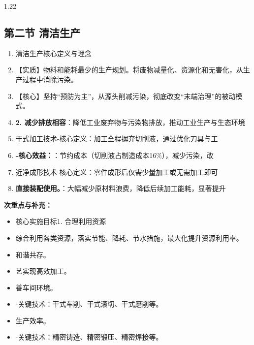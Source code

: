 \documentclass[12pt,a4paper]{article}
\begin{document}
\begin{spacing}{1.22}
\subsection{第二节 清洁生产}
\begin{tcolorbox}[colback=yellow!6,colframe=red!55!black,title=重点,left=1mm,right=1mm]
\begin{enumerate}[leftmargin=2.2em,label=\arabic*.]
  \item 清洁生产核心定义与理念
  \item 【实质】物料和能耗最少的生产规划。将废物减量化、资源化和无害化，从生产过程中消除污染。
  \item 【核心】坚持“预防为主”，从源头削减污染，彻底改变“末端治理”的被动模式。
  \item \textbf{2. 减少排放相容}：降低工业废弃物与污染物排放，推动工业生产与生态环境
  \item 干式加工技术-核心定义：加工全程摒弃切削液，通过优化刀具与工
  \item \textbf{-核心效益：}：节约成本（切削液占制造成本16\%），减少污染，改
  \item 近净成形技术-核心定义：零件成形后仅需少量加工或无需加工即可
  \item \textbf{直接装配使用。}：大幅减少原材料浪费，降低后续加工能耗，显著提升
\end{enumerate}
\end{tcolorbox}
\noindent\textbf{次重点与补充：}
\begin{itemize}[leftmargin=2.2em,label=--]
  \item 核心实施目标1. 合理利用资源
  \item 综合利用各类资源，落实节能、降耗、节水措施，最大化提升资源利用率。
  \item 和谐共存。
  \item 艺实现高效加工。
  \item 善车间环境。
  \item -关键技术：干式车削、干式滚切、干式磨削等。
  \item 生产效率。
  \item -关键技术：精密铸造、精密锻压、精密焊接等。
\end{itemize}


\end{spacing}
\end{document}
